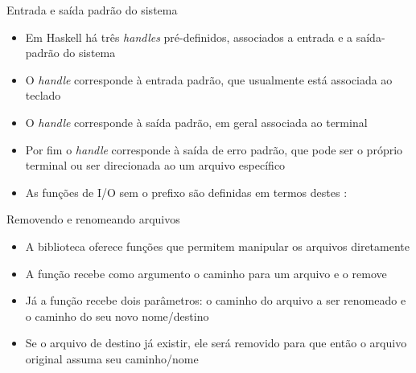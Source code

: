 \begin{frame}[fragile]{Entrada e saída padrão do sistema}

    \begin{itemize}
        \item Em Haskell há três \textit{handles} pré-definidos, associados a entrada e a
            saída-padrão do sistema

        \item O \textit{handle}  corresponde à entrada padrão, que usualmente
            está associada ao teclado

        \item O \textit{handle}  corresponde à saída padrão, em geral 
            associada ao terminal

        \item Por fim o \textit{handle}  corresponde à saída de erro padrão,
            que pode ser o próprio terminal ou ser direcionada ao um arquivo específico

        \item As funções de I/O sem o prefixo  são definidas em termos destes
            :


    \end{itemize}

\end{frame}

\begin{frame}[fragile]{Removendo e renomeando arquivos}

    \begin{itemize}
        \item A biblioteca  oferece funções que permitem
            manipular os arquivos diretamente

        \item A função  recebe como argumento o caminho para um arquivo
            e o remove


        \item Já a função  recebe dois parâmetros: o caminho do arquivo
            a ser renomeado e o caminho do seu novo nome/destino


        \item Se o arquivo de destino já existir, ele será removido para que então o arquivo
            original assuma seu caminho/nome
    \end{itemize}

\end{frame}

